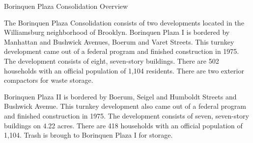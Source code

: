 Borinquen Plaza Consolidation Overview

The Borinquen Plaza Consolidation consists of two developments located in the Williamsburg neighborhood of Brooklyn. Borinquen Plaza I is bordered by Manhattan and Bushwick Avenues, Boerum and Varet Streets. This turnkey development came out of a federal program and finished construction in 1975. The development consists of eight, seven-story buildings. There are 502 households with an official population of 1,104 residents. There are two exterior compactors for waste storage.

Borinquen Plaza II is bordered by Boerum, Seigel and Humboldt Streets and Bushwick Avenue. This turnkey development also came out of a federal program and finished construction in 1975. The development consists of seven, seven-story buildings on 4.22 acres. There are 418 households with an official population of 1,104. Trash is brough to Borinquen Plaza I for storage.